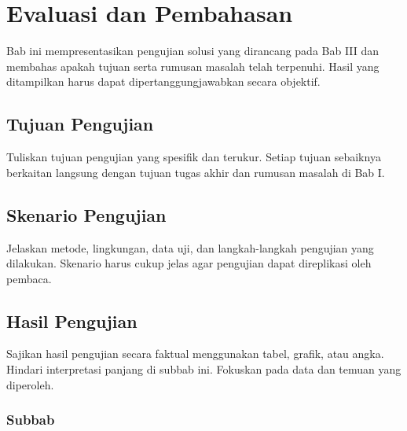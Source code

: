 %
%
%
%
%

\chapter{Evaluasi dan Pembahasan}

Bab ini mempresentasikan pengujian solusi yang dirancang pada Bab
III dan membahas apakah tujuan serta rumusan masalah telah
terpenuhi. Hasil yang ditampilkan harus dapat dipertanggungjawabkan
secara objektif.

\section{Tujuan Pengujian}

Tuliskan tujuan pengujian yang spesifik dan terukur. Setiap tujuan
sebaiknya berkaitan langsung dengan tujuan tugas akhir dan
rumusan masalah di Bab I.

\blindtext%

\section{Skenario Pengujian}

Jelaskan metode, lingkungan, data uji, dan langkah-langkah
pengujian yang dilakukan. Skenario harus cukup jelas agar pengujian
dapat direplikasi oleh pembaca.

\blindtext%

\section{Hasil Pengujian}

Sajikan hasil pengujian secara faktual menggunakan tabel, grafik,
atau angka. Hindari interpretasi panjang di subbab ini. Fokuskan
pada data dan temuan yang diperoleh.

    \subsection{Subbab}

    \blindtext%

